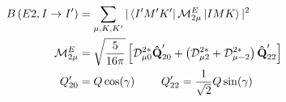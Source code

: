 \begin{align}
\label{eqn:chp2-triaxial-rotor-reduced-transitions}
B\left(E2,I\rightarrow{}I'\right) &=\sum\limits_{\mu{},K,K'}^{}|\Bra{I'M'K'}\mathcal{M}^E_{2\mu}\Ket{IMK}|^2\\
\mathcal{M}^E_{2\mu} &= \sqrt{\frac{5}{16\pi}}\left[\mathcal{D}^{2*}_{\mu{}0}\boldsymbol{\hat{\textbf{Q}}}'_{20}+\left(\mathcal{D}^{2*}_{\mu{}2}+\mathcal{D}^{2*}_{\mu{}-2}\right)\boldsymbol{\hat{\textbf{Q}}}'_{22}\right] \nonumber\\
Q'_{20} &= Q \cos(\gamma) ~~~~~~~ Q'_{22} = \frac{1}{\sqrt{2}}Q \sin(\gamma) \nonumber
\end{align}

